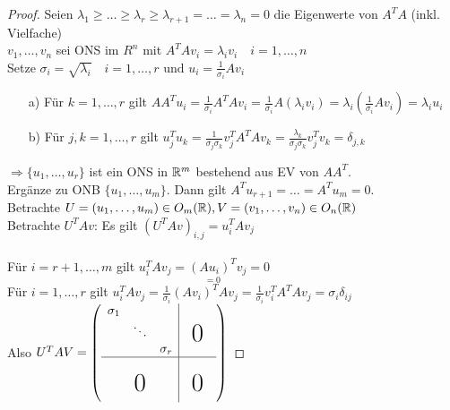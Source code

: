 \begin{proof}
	Seien $\lambda_1 \ge \ldots \ge \lambda_r\ge\lambda_{r+1}=\ldots=\lambda_n=0$ die Eigenwerte von $A^TA$ (inkl. Vielfache)\\
	$v_1,\ldots,v_n$ sei ONS im $R^n$ mit $A^TAv_i=\lambda_iv_i \quad i=1,\ldots,n$\\
	Setze $\sigma_i =\sqrt{\lambda_i} \quad i=1,\ldots,r \text{ und } u_i=\frac{1}{\sigma_i}Av_i$\\
	\begin{itemize}
		\item[a)]Für $k=1,\ldots,r$ gilt $AA^Tu_i=\frac{1}{\sigma_i}A^TAv_i=\frac{1}{\sigma_i}A(\lambda_iv_i)=\lambda_i\left(\frac{1}{\sigma_i}Av_i\right)=\lambda_iu_i$
		\item[b)]Für $j,k=1,\ldots,r$ gilt $u_j^{T}u_k=\frac{1}{\sigma_j\sigma_k}v_j^{T}A^TAv_k=\frac{\lambda_k}{\sigma_j\sigma_k}v_j^{T}v_k=\delta_{j,k}$
	\end{itemize}
	$\Rightarrow \{u_1,\ldots,u_r\}$ ist ein ONS in $\mathbb R^m$ bestehend aus EV von $AA^T$.\\\newline
	Ergänze zu ONB $\{u_1,\ldots,u_m\}$. Dann gilt $A^Tu_{r+1}=\ldots=A^Tu_m=0$.\\
	Betrachte $U=(u_1,\ldots,u_m) \in O_m(\mathbb R), V=(v_1,\ldots,v_n) \in O_n(\mathbb R)$\\
	Betrachte $U^TAv$: Es gilt $(U^TAv)_{i,j}=u_i^{T}Av_j$\\\\
	Für $i=r+1,\ldots,m$ gilt $u_i^{T}Av_j=\underset{=0}{(Au_i)^T}v_j=0$\\
	Für $i=1,\ldots,r $ gilt $u_i^{T}Av_j=\frac{1}{\sigma_i}(Av_i)^TAv_j=\frac{1}{\sigma_i}v_i^{T}A^TAv_j=\sigma_i\delta_{ij}$\\\newline
	Also $U^TAV= \left(\begin{array}{c|c}
		\begin{matrix}\sigma_1 & &  \\&\ddots & \\ & & \sigma_r\end{matrix} &\begin{matrix}& &\\ &\bigzero& \\&&\end{matrix}\\\hline
		\bigzero &\begin{matrix}& &\\ &\bigzero& \\&&\end{matrix}
		\end{array}\right)$
\end{proof}
